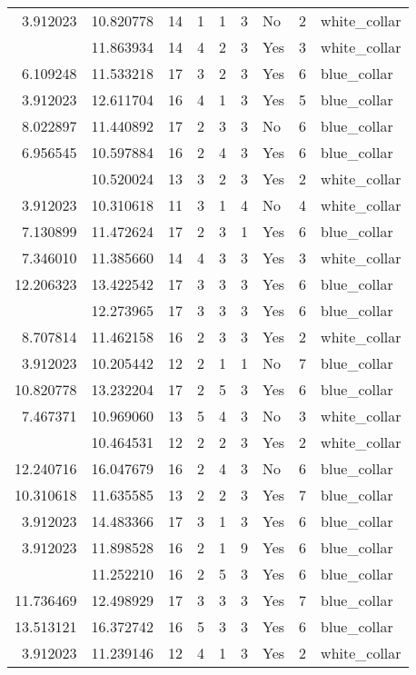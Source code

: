 \documentclass[
]{article}
\begin{document}
\begin{longtable}[t]{rrrrrllrl}
3.912023 & 10.820778 & 14 & 1 & 1 & 3 & No & 2 & white\_collar\\
\addlinespace
4.007333 & 11.863934 & 14 & 4 & 2 & 3 & Yes & 3 & white\_collar\\
6.109248 & 11.533218 & 17 & 3 & 2 & 3 & Yes & 6 & blue\_collar\\
3.912023 & 12.611704 & 16 & 4 & 1 & 3 & Yes & 5 & blue\_collar\\
8.022897 & 11.440892 & 17 & 2 & 3 & 3 & No & 6 & blue\_collar\\
6.956545 & 10.597884 & 16 & 2 & 4 & 3 & Yes & 6 & blue\_collar\\
\addlinespace
4.094345 & 10.520024 & 13 & 3 & 2 & 3 & Yes & 2 & white\_collar\\
3.912023 & 10.310618 & 11 & 3 & 1 & 4 & No & 4 & white\_collar\\
7.130899 & 11.472624 & 17 & 2 & 3 & 1 & Yes & 6 & blue\_collar\\
7.346010 & 11.385660 & 14 & 4 & 3 & 3 & Yes & 3 & white\_collar\\
12.206323 & 13.422542 & 17 & 3 & 3 & 3 & Yes & 6 & blue\_collar\\
\addlinespace
9.215328 & 12.273965 & 17 & 3 & 3 & 3 & Yes & 6 & blue\_collar\\
8.707814 & 11.462158 & 16 & 2 & 3 & 3 & Yes & 2 & white\_collar\\
3.912023 & 10.205442 & 12 & 2 & 1 & 1 & No & 7 & blue\_collar\\
10.820778 & 13.232204 & 17 & 2 & 5 & 3 & Yes & 6 & blue\_collar\\
7.467371 & 10.969060 & 13 & 5 & 4 & 3 & No & 3 & white\_collar\\
\addlinespace
8.846497 & 10.464531 & 12 & 2 & 2 & 3 & Yes & 2 & white\_collar\\
12.240716 & 16.047679 & 16 & 2 & 4 & 3 & No & 6 & blue\_collar\\
10.310618 & 11.635585 & 13 & 2 & 2 & 3 & Yes & 7 & blue\_collar\\
3.912023 & 14.483366 & 17 & 3 & 1 & 3 & Yes & 6 & blue\_collar\\
3.912023 & 11.898528 & 16 & 2 & 1 & 9 & Yes & 6 & blue\_collar\\
\addlinespace
5.298317 & 11.252210 & 16 & 2 & 5 & 3 & Yes & 6 & blue\_collar\\
11.736469 & 12.498929 & 17 & 3 & 3 & 3 & Yes & 7 & blue\_collar\\
13.513121 & 16.372742 & 16 & 5 & 3 & 3 & Yes & 6 & blue\_collar\\
3.912023 & 11.239146 & 12 & 4 & 1 & 3 & Yes & 2 & white\_collar\\

\end{longtable}
\end{document}
